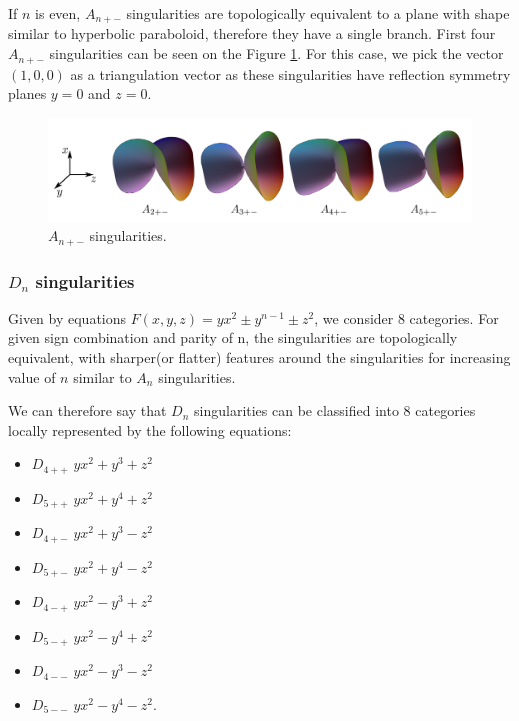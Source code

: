 If $n$ is even, $A_{n+-}$ singularities are topologically equivalent to a plane
with shape similar to hyperbolic paraboloid, therefore they have a single branch.
First four $A_{n+-}$ singularities can be seen on the Figure \ref{img:5}.
For this case, we pick the vector $(1, 0, 0)$ as a triangulation vector as
these singularities have reflection symmetry planes $y=0$ and $z=0$.

\begin{figure}
    \centerline{\includegraphics[scale=0.5]{images/img5}}
    \caption[$A_{n+-}$ singularities]
    {$A_{n+-}$ singularities. \cite{morris2003client}}
    \label{img:5}
\end{figure}

\subsubsection*{$D_n$ singularities}

Given by equations $F(x,y,z)=yx^2\pm y^{n-1}\pm z^2$, we consider 8 categories.
For given sign combination and parity of n, the singularities are topologically
equivalent, with sharper(or flatter) features around the singularities for increasing
value of $n$ similar to $A_n$ singularities.

We can therefore say that $D_n$ singularities can be classified into 8 categories
locally represented by the following equations:
\begin{itemize}
    \item $D_{4++}$ \hspace{5mm} $yx^2 + y^3 + z^2$
    \item $D_{5++}$ \hspace{5mm} $yx^2 + y^4 + z^2$
    \item $D_{4+-}$ \hspace{5mm} $yx^2 + y^3 - z^2$
    \item $D_{5+-}$ \hspace{5mm} $yx^2 + y^4 - z^2$
    \item $D_{4-+}$ \hspace{5mm} $yx^2 - y^3 + z^2$
    \item $D_{5-+}$ \hspace{5mm} $yx^2 - y^4 + z^2$
    \item $D_{4--}$ \hspace{5mm} $yx^2 - y^3 - z^2$
    \item $D_{5--}$ \hspace{5mm} $yx^2 - y^4 - z^2$.
\end{itemize}

